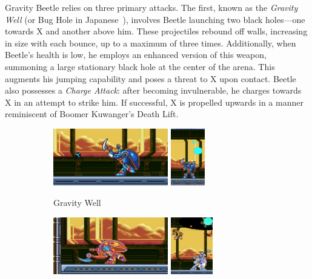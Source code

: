 Gravity Beetle relies on three primary attacks. The first, known as the \emph{Gravity Well} (or Bug Hole in Japanese~\cite{wiki:Gravity_beetle}), involves Beetle launching two black holes—one towards X and another above him. These projectiles rebound off walls, increasing in size with each bounce, up to a maximum of three times. Additionally, when Beetle's health is low, he employs an enhanced version of this weapon, summoning a large stationary black hole at the center of the arena. This augments his jumping capability and poses a threat to X upon contact. Beetle also possesses a \emph{Charge Attack}: after becoming invulnerable, he charges towards X in an attempt to strike him. If successful, X is propelled upwards in a manner reminiscent of Boomer Kuwanger's Death Lift.

\begin{figure}[htp]
	\centering
	\begin{subfigure}{\linewidth}
		\centering
		\includegraphics[height=2.5cm]{figures/X3/Gravity_beetle/Beetle_shot.jpg}
		\includegraphics[height=2.5cm]{figures/X3/Gravity_beetle/Beetle_shot_2.jpg}
		\caption{Gravity Well}
	\end{subfigure}
	\begin{subfigure}{\linewidth}
		\centering
		\includegraphics[height=2.5cm]{figures/X3/Gravity_beetle/Beetle_charge.jpg}
		\includegraphics[height=2.5cm]{figures/X3/Gravity_beetle/Beetle_charge_2.jpg}

\end{subfigure}
\end{figure}
